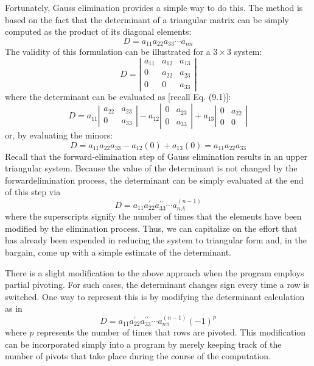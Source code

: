 \documentclass[../main.tex]{subfiles}
\begin{document}
Fortunately, Gauss elimination provides a simple way to do this. The method is based on the fact that the determinant of a triangular matrix can be simply computed as the product of its diagonal elements:
$$
D=a_{11} a_{22} a_{33} \cdots a_{n n}
$$
The validity of this formulation can be illustrated for a $3 \times 3$ system:
$$
D=\left|\begin{array}{ccc}
a_{11} & a_{12} & a_{13} \\
0 & a_{22} & a_{23} \\
0 & 0 & a_{33}
\end{array}\right|
$$
where the determinant can be evaluated as [recall Eq. (9.1)]:
$$
D=a_{11}\left|\begin{array}{cc}
a_{22} & a_{23} \\
0 & a_{33}
\end{array}\right|-a_{12}\left|\begin{array}{cc}
0 & a_{23} \\
0 & a_{33}
\end{array}\right|+a_{13}\left|\begin{array}{cc}
0 & a_{22} \\
0 & 0
\end{array}\right|
$$
or, by evaluating the minors:
$$
D=a_{11} a_{22} a_{33}-a_{12}(0)+a_{13}(0)=a_{11} a_{22} a_{33}
$$
Recall that the forward-elimination step of Gauss elimination results in an upper triangular system. Because the value of the determinant is not changed by the forwardelimination process, the determinant can be simply evaluated at the end of this step via
$$
D=a_{11} a_{22}^{\prime} a_{33}^{\prime \prime} \cdots a_{n A}^{(n-1)}
$$
where the superscripts signify the number of times that the elements have been modified by the elimination process. Thus, we can capitalize on the effort that has already been expended in reducing the system to triangular form and, in the bargain, come up with a simple estimate of the determinant.

There is a slight modification to the above approach when the program employs partial pivoting. For such cases, the determinant changes sign every time a row is switched. One way to represent this is by modifying the determinant calculation as in
$$
D=a_{11} a_{22}^{\prime} a_{33}^{\prime \prime} \cdots a_{n \pi}^{(n-1)}(-1)^{p}
$$
where $p$ represents the number of times that rows are pivoted. This modification can be incorporated simply into a program by merely keeping track of the number of pivots that take place during the course of the computation.
\bigskip
\end{document}
